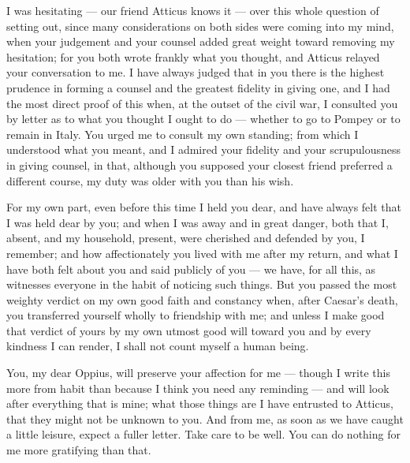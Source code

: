 

 I was hesitating --- our friend Atticus knows it --- over this whole question of setting out, since many considerations on both sides were coming into my mind, when your judgement and your counsel added great weight toward removing my hesitation; for you both wrote frankly what you thought, and Atticus relayed your conversation to me. I have always judged that in you there is the highest prudence in forming a counsel and the greatest fidelity in giving one, and I had the most direct proof of this when, at the outset of the civil war, I consulted you by letter as to what you thought I ought to do --- whether to go to Pompey or to remain in Italy. You urged me to consult my own standing; from which I understood what you meant, and I admired your fidelity and your scrupulousness in giving counsel, in that, although you supposed your closest friend preferred a different course, my duty was older with you than his wish.

 For my own part, even before this time I held you dear, and have always felt that I was held dear by you; and when I was away and in great danger, both that I, absent, and my household, present, were cherished and defended by you, I remember; and how affectionately you lived with me after my return, and what I have both felt about you and said publicly of you --- we have, for all this, as witnesses everyone in the habit of noticing such things. But you passed the most weighty verdict on my own good faith and constancy when, after Caesar's death, you transferred yourself wholly to friendship with me; and unless I make good that verdict of yours by my own utmost good will toward you and by every kindness I can render, I shall not count myself a human being.

 You, my dear Oppius, will preserve your affection for me --- though I write this more from habit than because I think you need any reminding --- and will look after everything that is mine; what those things are I have entrusted to Atticus, that they might not be unknown to you. And from me, as soon as we have caught a little leisure, expect a fuller letter. Take care to be well. You can do nothing for me more gratifying than that.
